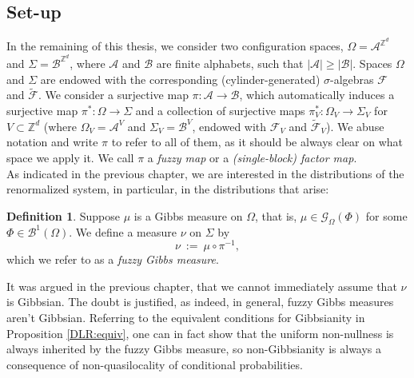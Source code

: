 \documentclass[12pt]{article}
\newcommand{\A}{\mathcal{A}}
\newcommand{\B}{\mathcal{B}}
\newcommand{\BB}{\mathscr{B}}
\newcommand{\F}{\mathcal{F}}
\newcommand{\G}{\mathcal{G}}
\newcommand{\Z}{\mathbb{Z}}
\newcommand{\ra}{\rightarrow}
\newcommand{\1}{\mathbbm{1}}
\newcommand{\5}{\vspace{0.5cm}}
\renewcommand{\tilde}{\widetilde}
\theoremstyle{definition}
\newtheorem{df}[thm]{Definition}
\begin{document}

\subsection{Set-up}

In the remaining of this thesis, we consider two configuration spaces, $\Omega=\A^{\Z^d}$ and $\Sigma=\B^{\Z^d}$, where $\A$ and $\B$ are finite alphabets, such that $|\A|\geq|\B|$. Spaces $\Omega$ and $\Sigma$ are endowed with the corresponding (cylinder-generated) $\sigma$-algebras $\F$ and $\tilde{\F}$. We consider a surjective map $\pi:\A\ra\B$, which automatically induces a surjective map $\pi^*:\Omega\ra\Sigma$ and a collection of surjective maps $\pi_V^*:\Omega_V\ra\Sigma_V$ for $V\subset\Z^d$ (where $\Omega_V=\A^V$ and $\Sigma_V=\B^V$, endowed with $\F_V$ and $\tilde{\F}_V$). We abuse notation and write $\pi$ to refer to all of them, as it should be always clear on what space we apply it. We call $\pi$ a \textit{fuzzy map} or a \textit{(single-block) factor map}.  \\

As indicated in the previous chapter, we are interested in the distributions of the renormalized system, in particular, in the distributions that arise:
\begin{df}
Suppose $\mu$ is a Gibbs measure on $\Omega$, that is, $\mu\in\G_\Omega(\Phi)$ for some $\Phi\in\BB^1(\Omega)$. We define a measure $\nu$ on $\Sigma$ by
$$\nu ~:=~ \mu \circ \pi^{-1},$$
which we refer to as a \textit{fuzzy Gibbs measure}.
\end{df}
It was argued in the previous chapter, that we cannot immediately assume that $\nu$ is Gibbsian. The doubt is justified, as indeed, in general, fuzzy Gibbs measures aren't Gibbsian. Referring to the equivalent conditions for Gibbsianity in Proposition \ref{DLR:equiv}, one can in fact show that the uniform non-nullness is always inherited by the fuzzy Gibbs measure, so non-Gibbsianity is always a consequence of non-quasilocality of conditional probabilities. \\
\end{document}
